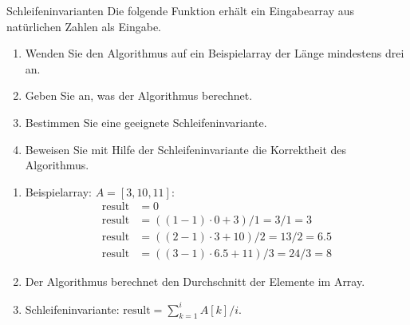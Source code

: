 \documentclass{article}
\begin{document}
\begin{exercise}{Schleifeninvarianten}
  Die folgende Funktion erhält ein Eingabearray aus natürlichen Zahlen als Eingabe.
  
  \begin{enumerate}
    \item Wenden Sie den Algorithmus auf ein Beispielarray der Länge mindestens drei an.
    \item Geben Sie an, was der Algorithmus berechnet.
    \item Bestimmen Sie eine geeignete Schleifeninvariante.
    \item Beweisen Sie mit Hilfe der Schleifeninvariante die Korrektheit des Algorithmus.
  \end{enumerate}

  \begin{solution}
    \begin{enumerate}
      \item Beispielarray: $A = [3,10,11]$:
            \begin{align*}
              \text{result} & = 0                                   \\
              \text{result} & = ((1-1) \cdot 0 + 3)/1 = 3/1 = 3     \\
              \text{result} & = ((2-1) \cdot 3 + 10)/2 = 13/2 = 6.5 \\
              \text{result} & = ((3-1) \cdot 6.5 + 11)/3 = 24/3 = 8
            \end{align*}
      \item Der Algorithmus berechnet den Durchschnitt der Elemente im Array.
      \item Schleifeninvariante: $\text{result} = \sum_{k=1}^{i} A[k]/i$.
            \begin{invariant}
\end{invariant}
\end{enumerate}
\end{solution}
\end{exercise}
\end{document}
